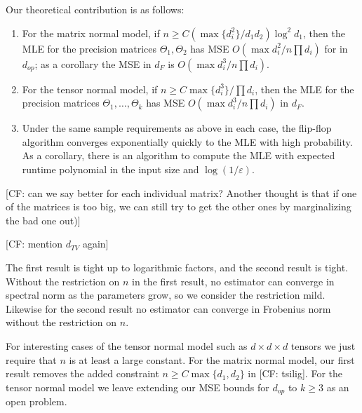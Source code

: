 \documentclass{article}
\newcommand\eps{\varepsilon}
\newcommand{\CF}[1]{{\color{purple}[CF: #1]}}
\begin{document}
Our theoretical contribution is as follows:
\begin{enumerate}
\item For the matrix normal model, if $n \geq C (\max\{d_i^2\}/d_1 d_2) \log^2 d_1$, then the MLE for the precision matrices $\Theta_1, \Theta_2$ has MSE $O( \max d_i^2/ n \prod d_i )$ for in $d_{op}$; as a corollary the MSE in $d_F$ is $O( \max d_i^3/ n \prod d_i )$.
\item For the tensor normal model, if $n \geq C \max\{d_i^3\}/ \prod d_i$, then the MLE for the precision matrices $\Theta_1, \dots, \Theta_k$ has MSE $O(\max d_i^3/ n \prod d_i)$ in $d_F$.
\item Under the same sample requirements as above in each case, the flip-flop algorithm converges exponentially quickly to the MLE with high probability. As a corollary, there is an algorithm to compute the MLE with expected runtime polynomial in the input size and $\log(1/\eps)$. 
\end{enumerate}
\CF{can we say better for each individual matrix? Another thought is that if one of the matrices is too big, we can still try to get the other ones by marginalizing the bad one out)}

\CF{mention $d_{TV}$ again}

The first result is tight up to logarithmic factors, and the second result is tight. Without the restriction on $n$ in the first result, no estimator can converge in spectral norm as the parameters grow, so we consider the restriction mild. Likewise for the second result no estimator can converge in Frobenius norm without the restriction on $n$. 


For interesting cases of the tensor normal model such as $d\times d \times d$ tensors we just require that $n$ is at least a large constant. For the matrix normal model, our first result removes the added constraint $n \geq C \max\{d_1,d_2\}$ in \CF{tsilig}. For the tensor normal model we leave extending our MSE bounds for $d_{op}$ to $k \geq 3$ as an open problem. 
\end{document}
